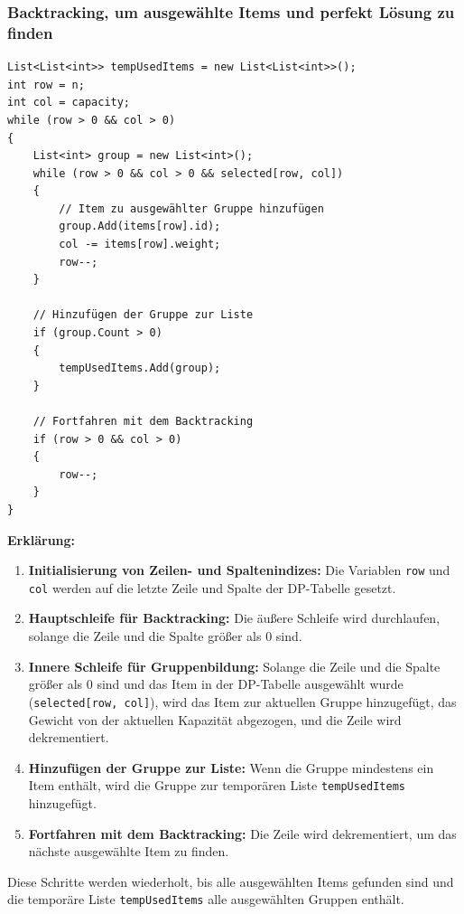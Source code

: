\subsubsection{Backtracking, um ausgewählte Items und perfekt Lösung zu finden}
\begin{lstlisting}[style=csharp, caption={}, label=code:backtrack]
List<List<int>> tempUsedItems = new List<List<int>>();
int row = n;
int col = capacity;
while (row > 0 && col > 0)
{
    List<int> group = new List<int>();
    while (row > 0 && col > 0 && selected[row, col])
    {
        // Item zu ausgewählter Gruppe hinzufügen
        group.Add(items[row].id);
        col -= items[row].weight;
        row--;
    }

    // Hinzufügen der Gruppe zur Liste
    if (group.Count > 0)
    {
        tempUsedItems.Add(group);
    }

    // Fortfahren mit dem Backtracking
    if (row > 0 && col > 0)
    {
        row--;
    }
}
\end{lstlisting}

\textbf{Erklärung:}
\begin{enumerate}
    \item \textbf{Initialisierung von Zeilen- und Spaltenindizes:} Die Variablen \texttt{row} und \texttt{col} werden auf die letzte Zeile und Spalte der DP-Tabelle gesetzt.

    \item \textbf{Hauptschleife für Backtracking:} Die äußere Schleife wird durchlaufen, solange die Zeile und die Spalte größer als 0 sind.

    \item \textbf{Innere Schleife für Gruppenbildung:} Solange die Zeile und die Spalte größer als 0 sind und das Item in der DP-Tabelle ausgewählt wurde (\texttt{selected[row, col]}), wird das Item zur aktuellen Gruppe hinzugefügt, das Gewicht von der aktuellen Kapazität abgezogen, und die Zeile wird dekrementiert.

    \item \textbf{Hinzufügen der Gruppe zur Liste:} Wenn die Gruppe mindestens ein Item enthält, wird die Gruppe zur temporären Liste \texttt{tempUsedItems} hinzugefügt.

    \item \textbf{Fortfahren mit dem Backtracking:} Die Zeile wird dekrementiert, um das nächste ausgewählte Item zu finden.
\end{enumerate}

Diese Schritte werden wiederholt, bis alle ausgewählten Items gefunden sind und die temporäre Liste \texttt{tempUsedItems} alle ausgewählten Gruppen enthält.\\

